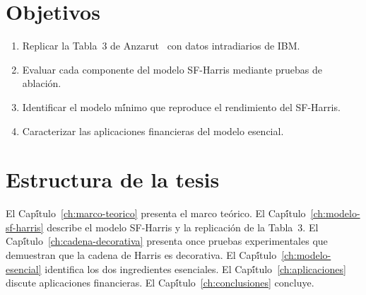 \section{Objetivos}

\begin{enumerate}
    \item Replicar la Tabla~3 de Anzarut~\citep{anzarut2024} con datos intradiarios de IBM.
    \item Evaluar cada componente del modelo SF-Harris mediante pruebas de ablaci\'{o}n.
    \item Identificar el modelo m\'{\'i}nimo que reproduce el rendimiento del SF-Harris.
    \item Caracterizar las aplicaciones financieras del modelo esencial.
\end{enumerate}

\section{Estructura de la tesis}

El Cap\'{\'i}tulo~\ref{ch:marco-teorico} presenta el marco te\'{o}rico.
El Cap\'{\'i}tulo~\ref{ch:modelo-sf-harris} describe el modelo SF-Harris y la replicaci\'{o}n de la Tabla~3.
El Cap\'{\'i}tulo~\ref{ch:cadena-decorativa} presenta once pruebas experimentales que demuestran
que la cadena de Harris es decorativa.
El Cap\'{\'i}tulo~\ref{ch:modelo-esencial} identifica los dos ingredientes esenciales.
El Cap\'{\'i}tulo~\ref{ch:aplicaciones} discute aplicaciones financieras.
El Cap\'{\'i}tulo~\ref{ch:conclusiones} concluye.